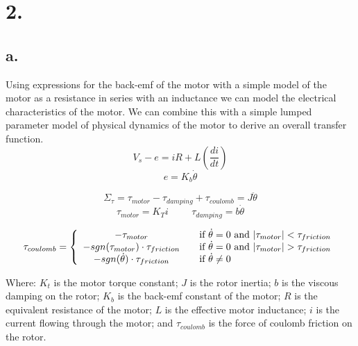 \documentclass{article}
\theoremstyle{plain}
\theoremstyle{definition}
\theoremstyle{remark}
\begin{document}
\clearpage

\section*{2.}

\subsection*{a.}

Using expressions for the back-emf of the motor with a simple model of the motor as a resistance in series with an inductance we can model the electrical characteristics of the motor.  We can combine this with a simple lumped parameter model of physical dynamics of the motor to derive an overall transfer function.  
$$V_{s} - e = iR + L\left(\frac{di}{dt}\right) $$
$$ e = K_{b} \dot{\theta} $$

$$ \Sigma_{\tau} = \tau_{motor} - \tau_{damping} + \tau_{coulomb} = J \ddot{\theta}$$
$$ \tau_{motor} = K_{T}i \hspace{1cm} \tau_{damping} = b \dot{\theta}$$

\[
  \tau_{coulomb} = \left\{
  \begin{array}{c l}
	 - \tau_{motor} & \quad \text{if } \dot{\theta} = 0 \text{ and } |\tau_{motor}| < \tau_{friction} \\
	- sgn(\tau_{motor}) \cdot \tau_{friction} & \quad \text{if } \dot{\theta} = 0 \text{ and } |\tau_{motor}| > \tau_{friction} \\
	- sgn(\dot{\theta}) \cdot \tau_{friction} & \quad \text{if } \dot{\theta} \neq 0 \\
  \end{array} \right.
\]

Where: $K_{t}$ is the motor torque constant; $J$ is the rotor inertia; $b$ is the viscous damping on the rotor; $K_{b}$ is the back-emf constant of the motor; $R$ is the equivalent resistance of the motor; $L$ is the effective motor inductance; $i$ is the current flowing through the motor; and $\tau_{coulomb}$ is the force of coulomb friction on the rotor. \\
\end{document}
